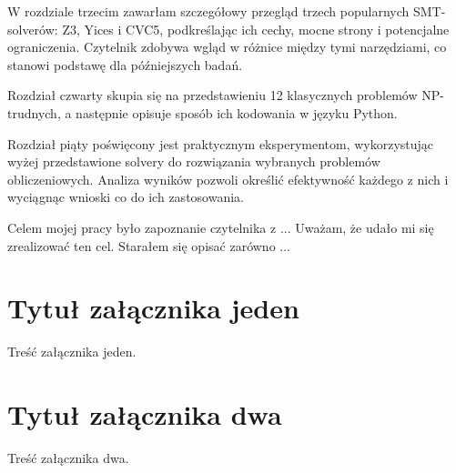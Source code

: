 \documentclass[xodstep]{wnspt}
\begin{document}
W rozdziale trzecim zawarłam szczegółowy przegląd trzech popularnych SMT-solverów: Z3, Yices i CVC5, podkreślając ich cechy, mocne strony i potencjalne ograniczenia. Czytelnik zdobywa wgląd w różnice między tymi narzędziami, co stanowi podstawę dla późniejszych badań.

Rozdział czwarty skupia się na przedstawieniu 12 klasycznych problemów NP-trudnych, a następnie opisuje sposób ich kodowania w języku Python.

Rozdział piąty poświęcony jest praktycznym eksperymentom, wykorzystując wyżej przedstawione solvery do rozwiązania wybranych problemów obliczeniowych. Analiza wyników pozwoli określić efektywność każdego z nich i wyciągnąc wnioski co do ich zastosowania.








\summary
Celem mojej pracy było zapoznanie czytelnika z ... 
Uważam, że udało mi się zrealizować ten cel. Starałem się opisać zarówno ...

\appendix
\chapter{Tytuł załącznika jeden}
Treść załącznika jeden.

\chapter{Tytuł załącznika dwa}
Treść załącznika dwa.

%
%

\printbibliography[filter=articles_and_proceedings,title={Bibliografia - artykuły i referaty konferencyjne}]
\printbibliography[type=book,title={Bibliografia - książki}]
\printbibliography[type=misc,title={Bibliografia - strony internetowe}]

\listoftables 

\listoffigures

\lstlistoflistings
\end{document}
